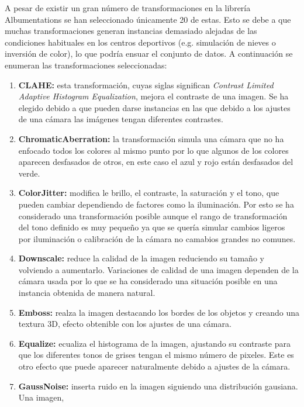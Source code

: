 \documentclass[12pt]{report} %
\begin{document}
    A pesar de existir un gran número de transformaciones en la librería
    Albumentations se han seleccionado únicamente 20 de estas. Esto se debe a
    que muchas transformaciones generan instancias demasiado alejadas de las
    condiciones habituales en los centros deportivos (e.g. simulación de nieves
    o inversión de color), lo que podría ensuar el conjunto de datos. A
    continuación se enumeran las transformaciones seleccionadas:

    \begin{enumerate} \item \textbf{CLAHE:} esta transformación, cuyas siglas
    significan \textit{Contrast Limited Adaptive Histogram Equalization},
    mejora el contraste de una imagen. Se ha elegido debido a que pueden darse
    instancias en las que debido a los ajustes de una cámara las imágenes
    tengan diferentes contrastes.
    \item \textbf{ChromaticAberration:} la
    transformación simula una cámara que no ha enfocado todos los colores al
    mismo punto por lo que algunos de los colores aparecen desfasados de otros,
    en este caso el azul y rojo están desfasados del verde.
    \item \textbf{ColorJitter:} modifica le brillo, el contraste, la saturación y el
    tono, que pueden cambiar dependiendo de factores como la iluminación. Por
    esto se ha considerado una transformación posible aunque el rango de
    transformación del tono definido es muy pequeño ya que se quería simular
    cambios ligeros por iluminación o calibración de la cámara no camabios
    grandes no comunes.
    \item \textbf{Downscale:} reduce la calidad de la
    imagen reduciendo su tamaño y volviendo a aumentarlo.  Variaciones de
    calidad de una imagen dependen de la cámara usada por lo que se ha
    considerado una situación posible en una instancia obtenida de manera
    natural.
    \item \textbf{Emboss:} realza la imagen destacando los bordes de
    los objetos y creando una textura 3D, efecto obtenible con los ajustes de
    una cámara.
    \item \textbf{Equalize:} ecualiza el histograma de la imagen,
    ajustando su contraste para que los diferentes tonos de grises tengan el
    mismo número de pixeles. Este es otro efecto que puede aparecer
    naturalmente debido a ajustes de la cámara.
    \item \textbf{GaussNoise:}
    inserta ruido en la imagen siguiendo una distribución gausiana. Una imagen,

\end{enumerate}
\end{document}
